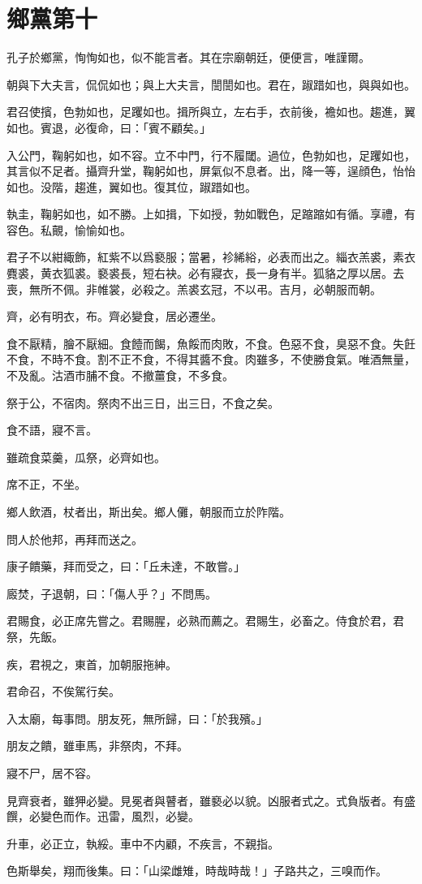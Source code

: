 \section[鄉黨第十]{鄉黨第十}

孔子於鄉黨，恂恂如也，似不能言者。其在宗廟朝廷，便便言，唯謹爾。

朝與下大夫言，侃侃如也；與上大夫言，誾誾如也。君在，踧踖如也，與與如也。

君召使擯，色勃如也，足躩如也。揖所與立，左右手，衣前後，襜如也。趨進，翼如也。賓退，必復命，曰：「賓不顧矣。」

入公門，鞠躬如也，如不容。立不中門，行不履閾。過位，色勃如也，足躩如也，其言似不足者。攝齊升堂，鞠躬如也，屏氣似不息者。出，降一等，逞顔色，怡怡如也。没階，趨進，翼如也。復其位，踧踖如也。

執圭，鞠躬如也，如不勝。上如揖，下如授，勃如戰色，足蹜蹜如有循。享禮，有容色。私覿，愉愉如也。

君子不以紺緅飾，紅紫不以爲褻服；當暑，袗絺綌，必表而出之。緇衣羔裘，素衣麑裘，黄衣狐裘。褻裘長，短右袂。必有寢衣，長一身有半。狐貉之厚以居。去喪，無所不佩。非帷裳，必殺之。羔裘玄冠，不以弔。吉月，必朝服而朝。

齊，必有明衣，布。齊必變食，居必遷坐。

食不厭精，膾不厭細。食饐而餲，魚餒而肉敗，不食。色惡不食，臭惡不食。失飪不食，不時不食。割不正不食，不得其醬不食。肉雖多，不使勝食氣。唯酒無量，不及亂。沽酒市脯不食。不撤薑食，不多食。

祭于公，不宿肉。祭肉不出三日，出三日，不食之矣。

食不語，寢不言。

雖疏食菜羹，瓜祭，必齊如也。

席不正，不坐。

鄉人飲酒，杖者出，斯出矣。鄉人儺，朝服而立於阼階。

問人於他邦，再拜而送之。

康子饋藥，拜而受之，曰：「丘未達，不敢嘗。」

廄焚，子退朝，曰：「傷人乎？」不問馬。

君賜食，必正席先嘗之。君賜腥，必熟而薦之。君賜生，必畜之。侍食於君，君祭，先飯。

疾，君視之，東首，加朝服拖紳。

君命召，不俟駕行矣。

入太廟，每事問。朋友死，無所歸，曰：「於我殯。」

朋友之饋，雖車馬，非祭肉，不拜。

寢不尸，居不容。

見齊衰者，雖狎必變。見冕者與瞽者，雖褻必以貌。凶服者式之。式負版者。有盛饌，必變色而作。迅雷，風烈，必變。

升車，必正立，執綏。車中不内顧，不疾言，不親指。

色斯舉矣，翔而後集。曰：「山梁雌雉，時哉時哉！」子路共之，三嗅而作。
